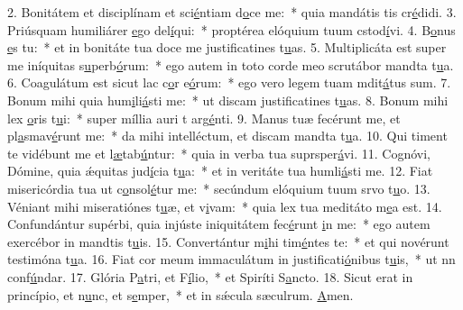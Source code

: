 2. Bonitátem et disciplínam et sci\uline{é}ntiam d\uline{o}ce me:~* quia mandátis tis cr\uline{é}didi.
3. Priúsquam humiliárer \uline{e}go del\uline{í}qui:~* proptérea elóquium tuum cstod\uline{í}vi.
4. B\uline{o}nus \uline{e}s tu:~* et in bonitáte tua doce me justificatines t\uline{u}as.
5. Multiplicáta est super me iníquitas s\uline{u}perb\uline{ó}rum:~* ego autem in toto corde meo scrutábor mandta t\uline{u}a.
6. Coagulátum est sicut lac c\uline{o}r e\uline{ó}rum:~* ego vero legem tuam mdit\uline{á}tus sum.
7. Bonum mihi quia hum\uline{i}li\uline{á}sti me:~* ut discam justificatines t\uline{u}as.
8. Bonum mihi lex \uline{o}ris t\uline{u}i:~* super míllia auri t arg\uline{é}nti.
9. Manus tuæ fecérunt me, et pl\uline{a}smav\uline{é}runt me:~* da mihi intelléctum, et discam mandta t\uline{u}a.
10. Qui timent te vidébunt me et l\uline{æ}tab\uline{ú}ntur:~* quia in verba tua suprsper\uline{á}vi.
11. Cognóvi, Dómine, quia ǽquitas jud\uline{í}cia t\uline{u}a:~* et in veritáte tua humli\uline{á}sti me.
12. Fiat misericórdia tua ut c\uline{o}nsol\uline{é}tur me:~* secúndum elóquium tuum srvo t\uline{u}o.
13. Véniant mihi miseratiónes t\uline{u}æ, et v\uline{i}vam:~* quia lex tua meditáto m\uline{e}a est.
14. Confundántur supérbi, quia injúste iniquitátem fec\uline{é}runt \uline{i}n me:~* ego autem exercébor in mandtis t\uline{u}is.
15. Convertántur m\uline{i}hi tim\uline{é}ntes te:~* et qui novérunt testimóna t\uline{u}a.
16. Fiat cor meum immaculátum in justificati\uline{ó}nibus t\uline{u}is,~* ut nn conf\uline{ú}ndar.
17. Glória P\uline{a}tri, et F\uline{í}lio,~* et Spiríti S\uline{a}ncto.
18. Sicut erat in princípio, et n\uline{u}nc, et s\uline{e}mper,~* et in sǽcula sæculrum. \uline{A}men.
